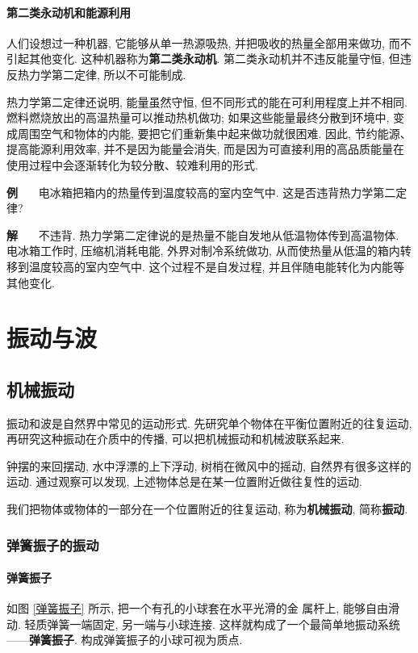\documentclass[11pt,a4paper]{ctexbook}
\newcounter{exam}[chapter]
\newcommand{\bre}{\ \ \ }
\newcommand{\examlabel}{\textbf{例\theexam}}
\newcommand{\soln}{\textbf{解}\bre}
\newenvironment{example}{\bigskip\par\refstepcounter{exam}\examlabel\bre}{\par}
\newenvironment{solution}{\par\soln}{\par\bigskip}
\begin{document}
\subsection{第二类永动机和能源利用}

人们设想过一种机器, 它能够从单一热源吸热, 并把吸收的热量全部用来做功, 而不引起其他变化.
这种机器称为\textbf{第二类永动机}. 第二类永动机并不违反能量守恒, 但违反热力学第二定律,
所以不可能制成.

热力学第二定律还说明, 能量虽然守恒, 但不同形式的能在可利用程度上并不相同.
燃料燃烧放出的高温热量可以推动热机做功; 如果这些能量最终分散到环境中,
变成周围空气和物体的内能, 要把它们重新集中起来做功就很困难. 因此, 节约能源、提高能源利用效率,
并不是因为能量会消失, 而是因为可直接利用的高品质能量在使用过程中会逐渐转化为较分散、较难利用的形式.

\begin{example}
电冰箱把箱内的热量传到温度较高的室内空气中. 这是否违背热力学第二定律?
\end{example}
\begin{solution}
不违背. 热力学第二定律说的是热量不能自发地从低温物体传到高温物体. 电冰箱工作时,
压缩机消耗电能, 外界对制冷系统做功, 从而使热量从低温的箱内转移到温度较高的室内空气中.
这个过程不是自发过程, 并且伴随电能转化为内能等其他变化.
\end{solution}

\part{振动与波}

\chapter{机械振动}

振动和波是自然界中常见的运动形式. 先研究单个物体在平衡位置附近的往复运动, 再研究这种振动在介质中的传播, 可以把机械振动和机械波联系起来.

钟摆的来回摆动, 水中浮漂的上下浮动, 树梢在微风中的摇动,
自然界有很多这样的运动.
通过观察可以发现, 上述物体总是在某一位置附近做往复性的运动.

我们把物体或物体的一部分在一个位置附近的往复运动,
称为\textbf{机械振动}, 简称\textbf{振动}.

\section{弹簧振子的振动}

\subsection{弹簧振子}
如图 \ref{弹簧振子} 所示, 把一个有孔的小球套在水平光滑的金
属杆上, 能够自由滑动. 轻质弹簧一端固定, 另一端与小球连接.
这样就构成了一个最简单地振动系统——\textbf{弹簧振子}.
构成弹簧振子的小球可视为质点.
\end{document}
